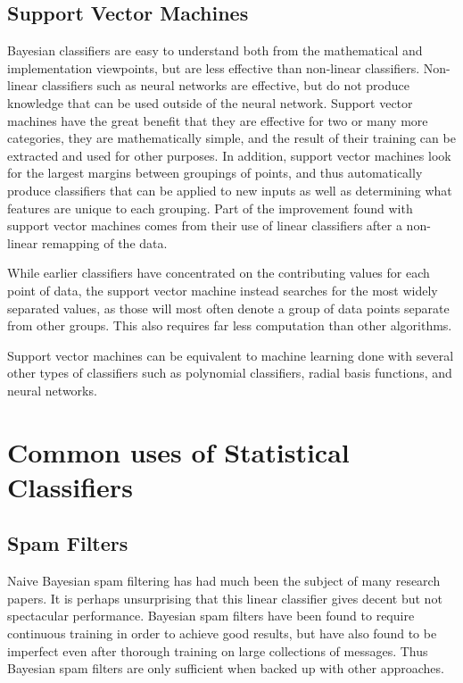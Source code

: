 \documentclass[12pt]{article}
\begin{document}
\subsection{Support Vector Machines}
Bayesian classifiers are easy to understand both from the mathematical and implementation viewpoints, but are
less effective than non-linear classifiers. Non-linear classifiers such as neural networks are effective, but
do not produce knowledge that can be used outside of the neural network.  Support vector machines have the
great benefit that they are effective for two or many more categories, they are mathematically simple, and the
result of their training can be extracted and used for other purposes. \cite{hearst1998support} In addition,
support vector machines look for the largest margins between groupings of points, and thus automatically
produce classifiers that can be applied to new inputs as well as determining what features are unique to each
grouping. Part of the improvement found with support vector machines comes from their use of linear
classifiers after a non-linear remapping of the data. \cite{cortes1995support}

While earlier classifiers have concentrated on the contributing values for each point of data, the support
vector machine instead searches for the most widely separated values, as those will most often denote a group
of data points separate from other groups. This also requires far less computation than other algorithms.

Support vector machines can be equivalent to machine learning done with several other types of classifiers
such as polynomial classifiers, radial basis functions, and neural networks. \cite{hearst1998support}


\section{Common uses of Statistical Classifiers}
\subsection{Spam Filters}
Naive Bayesian spam filtering has had much been the subject of many research papers. It is perhaps
unsurprising that this linear classifier gives decent but not spectacular performance.  Bayesian spam filters
have been found to require continuous training in order to achieve good results, but have also found to be
imperfect even after thorough training on large collections of messages. Thus Bayesian spam filters are only
sufficient when backed up with other approaches.  \cite{androutsopoulos2000evaluation}
\end{document}

